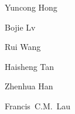 
\begin{IEEEbiography}{Yuncong Hong}
    \blindtext
\end{IEEEbiography}

\begin{IEEEbiography}{Bojie Lv}
    \blindtext
\end{IEEEbiography}

\begin{IEEEbiography}{Rui Wang}
    \blindtext
\end{IEEEbiography}

\begin{IEEEbiography}{Haisheng Tan}
    \blindtext
\end{IEEEbiography}

\begin{IEEEbiography}{Zhenhua Han}
    \blindtext
\end{IEEEbiography}

\begin{IEEEbiography}{Francis~C.M.~Lau}
    \blindtext
\end{IEEEbiography}

